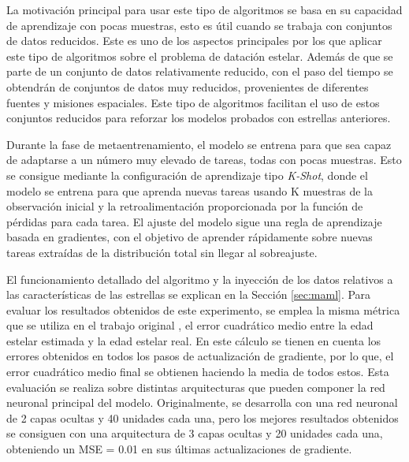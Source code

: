 \vspace{0.25cm}
La motivación principal para usar este tipo de algoritmos se basa en su capacidad de aprendizaje con pocas muestras, esto es útil cuando se trabaja con conjuntos de datos reducidos. Este es uno de los aspectos principales por los que aplicar este tipo de algoritmos sobre el problema de datación estelar. Además de que se parte de un conjunto de datos relativamente reducido, con el paso del tiempo se obtendrán de conjuntos de datos muy reducidos, provenientes de diferentes fuentes y misiones espaciales. Este tipo de algoritmos facilitan el uso de estos conjuntos reducidos para reforzar los modelos probados con estrellas anteriores.  


\vspace{0.25cm} 

Durante la fase de metaentrenamiento, el modelo se entrena para que sea capaz de adaptarse a un número muy elevado de tareas, todas con pocas muestras. Esto se consigue mediante la configuración de aprendizaje tipo \emph{K-Shot}, donde el modelo se entrena para que aprenda nuevas tareas usando K muestras de la observación inicial y la retroalimentación proporcionada por la función de pérdidas para cada tarea. El ajuste del modelo sigue una regla de aprendizaje basada en gradientes, con el objetivo de aprender rápidamente sobre nuevas tareas extraídas de la distribución total sin llegar al sobreajuste. 

\vspace{0.25cm}

El funcionamiento detallado del algoritmo y la inyección de los datos relativos a las características de las estrellas se explican en la Sección \ref{sec:maml}. Para evaluar los resultados obtenidos de este experimento, se emplea la misma métrica que se utiliza en el trabajo original \cite{finn2017modelagnostic}, el error cuadrático medio entre la edad estelar estimada y la edad estelar real. En este cálculo se tienen en cuenta los errores obtenidos en todos los pasos de actualización de gradiente, por lo que, el error cuadrático medio final se obtienen haciendo la media de todos estos.   %
Esta evaluación se realiza sobre distintas arquitecturas que pueden componer la red neuronal principal del modelo. Originalmente, se desarrolla con una red neuronal de 2 capas ocultas y 40 unidades cada una, pero los mejores resultados obtenidos se consiguen con una arquitectura de 3 capas ocultas y 20 unidades cada una, obteniendo un MSE = 0.01 en sus últimas actualizaciones de gradiente.

